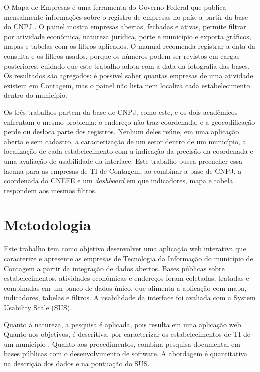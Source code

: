 \documentclass[a4paper,12pt]{article}
\begin{document}
O Mapa de Empresas é uma ferramenta do Governo Federal que publica mensalmente informações sobre o registro de empresas no país, a partir da base do CNPJ \cite{brasil2026}.
O painel mostra empresas abertas, fechadas e ativas, permite filtrar por atividade econômica, natureza jurídica, porte e município e exporta gráficos, mapas e tabelas com os filtros aplicados.
O manual recomenda registrar a data da consulta e os filtros usados, porque os números podem ser revistos em cargas posteriores, cuidado que este trabalho adota com a data da fotografia das bases.
Os resultados são agregados: é possível saber quantas empresas de uma atividade existem em Contagem, mas o painel não lista nem localiza cada estabelecimento dentro do município.

Os três trabalhos partem da base de CNPJ, como este, e os dois acadêmicos enfrentam o mesmo problema: o endereço não traz coordenada, e a geocodificação perde ou desloca parte dos registros.
Nenhum deles reúne, em uma aplicação aberta e sem cadastro, a caracterização de um setor dentro de um município, a localização de cada estabelecimento com a indicação da precisão da coordenada e uma avaliação de usabilidade da interface.
Este trabalho busca preencher essa lacuna para as empresas de TI de Contagem, ao combinar a base de CNPJ, a coordenada do CNEFE e um \textit{dashboard} em que indicadores, mapa e tabela respondem aos mesmos filtros.

\section{Metodologia}

Este trabalho tem como objetivo desenvolver uma aplicação web interativa que caracterize e apresente as empresas de Tecnologia da Informação do município de Contagem a partir da integração de dados abertos.
Bases públicas sobre estabelecimentos, atividades econômicas e endereços foram coletadas, tratadas e combinadas em um banco de dados único, que alimenta a aplicação com mapa, indicadores, tabelas e filtros.
A usabilidade da interface foi avaliada com a System Usability Scale (SUS).

Quanto à natureza, a pesquisa é aplicada, pois resulta em uma aplicação web.
Quanto aos objetivos, é descritiva, por caracterizar os estabelecimentos de TI de um município \cite{gil2008}.
Quanto aos procedimentos, combina pesquisa documental em bases públicas com o desenvolvimento de software.
A abordagem é quantitativa na descrição dos dados e na pontuação do SUS.
\end{document}

